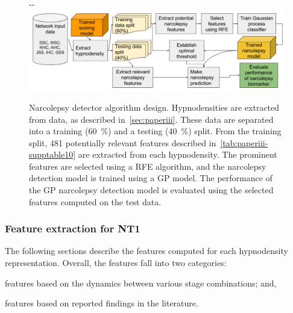\begin{figure}
    \begin{adjustwidth*}{}{-\marginparwidth-\marginparsep}
        \includegraphics[width=\textwidth+\marginparwidth+\marginparsep]{figures/paper-iii/Figure_5c.png}
        \caption[Narcolepsy detector algorithm design]{Narcolepsy detector algorithm design. Hypnodensities are extracted from data, as described in~\cref{sec:paperiii}. 
        These data are separated into a training (\SI{60}{\percent}) and a testing (\SI{40}{\percent}) split. 
        From the training split, 481 potentially relevant features described in~\cref{tab:paperiii-supptable10} are extracted from each hypnodensity. 
        The prominent features are selected using a \ac{RFE} algorithm, and the narcolepsy detection model is trained using a \ac{GP} model.
        The performance of the \ac{GP} narcolepsy detection  model is evaluated using the selected features computed on the test data.}
        \label{fig:paperiii-figure5c}
    \end{adjustwidth*}
\end{figure}

\subsubsection{Feature extraction for \ac{NT1}}

The following sections describe the features computed for each hypnodensity representation.
Overall, the features fall into two categories:
\begin{enumerate*}[label={(\roman*)}]
\item features based on the dynamics between various stage combinations; and,
\item features based on reported findings in the literature.
\end{enumerate*}

